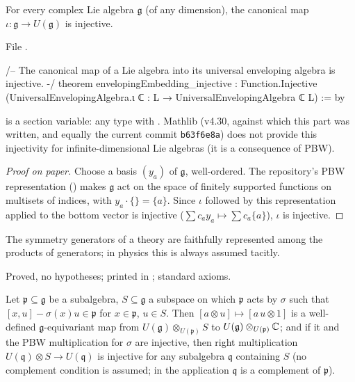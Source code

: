 \begin{theorem}\label{ch17:thm:enveloping}
For every complex Lie algebra $\mathfrak g$ (of any dimension), the canonical map $\iota:\mathfrak g\to U(\mathfrak g)$ is injective.
\end{theorem}

\noindent File .
\begin{leancode}
/-- The canonical map of a Lie algebra into its universal enveloping algebra is injective. -/
theorem envelopingEmbedding_injective :
    Function.Injective (UniversalEnvelopingAlgebra.ι ℂ : L → UniversalEnvelopingAlgebra ℂ L) := by
\end{leancode}

\begin{dictionary}
 is a section variable: any type with \chseventeenL{[LieRing L] [LieAlgebra ℂ L]}.  Mathlib (v4.30, against which this part was written, and
equally the current commit \texttt{b63f6e8a}) does not provide this injectivity for infinite-dimensional Lie algebras
(it is a consequence of PBW).
\end{dictionary}

\begin{proof}[Proof on paper]
Choose a basis $(y_a)$ of $\mathfrak g$, well-ordered.  The repository's PBW representation ()
makes $\mathfrak g$ act on the space of finitely supported functions on multisets of indices, with $y_a\cdot\{\}=\{a\}$.  Since
$\iota$ followed by this representation applied to the bottom vector is injective ($\sum c_ay_a\mapsto\sum c_a\{a\}$), $\iota$ is
injective.
\end{proof}

\begin{physics}
The symmetry generators of a theory are faithfully represented among the products of generators; in physics this is
always assumed tacitly.
\end{physics}

\begin{status}
Proved, no hypotheses; printed in ; standard axioms.
\end{status}

\begin{theorem}\label{ch17:thm:inducedvector}
Let $\mathfrak p\subseteq\mathfrak g$ be a subalgebra, $S\subseteq\mathfrak g$ a subspace on which $\mathfrak p$ acts by $\sigma$ such that
$[x,u]-\sigma(x)u\in\mathfrak p$ for $x\in\mathfrak p$, $u\in S$.  Then $[a\otimes u]\mapsto[a\,u\otimes1]$ is a well-defined
$\mathfrak g$-equivariant map from $U(\mathfrak g)\otimes_{U(\mathfrak p)}S$ to $U(\mathfrak g)\otimes_{U(\mathfrak p)}{\mathbb{C}}$; and if it and the PBW
multiplication for $\sigma$ are injective, then right multiplication $U(\mathfrak q)\otimes S\to U(\mathfrak q)$ is injective for any subalgebra
$\mathfrak q$ containing $S$ (no complement condition is assumed; in the application $\mathfrak q$ is a complement of $\mathfrak p$).
\end{theorem}

